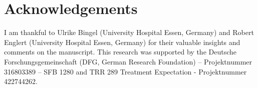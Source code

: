 \documentclass{article}
\begin{document}
\section{Acknowledgements}
I am thankful to Ulrike Bingel (University Hospital Essen, Germany) and Robert Englert (University Hospital Essen, Germany) for their valuable insights and comments on the manuscript. This research was supported by the Deutsche Forschungsgemeinschaft (DFG, German Research Foundation) – Projektnummer 316803389 – SFB 1280  and TRR 289 Treatment Expectation - Projektnummer 422744262.




\newpage

\end{document}
